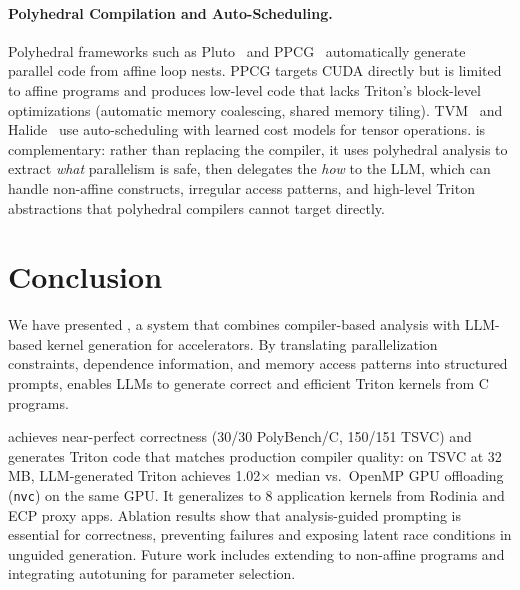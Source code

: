 \documentclass[sigconf]{acmart}
\begin{document}
\paragraph{Polyhedral Compilation and Auto-Scheduling.}
Polyhedral frameworks such as Pluto~\cite{bondhugula2008pluto} and
PPCG~\cite{verdoolaege2013ppcg} automatically generate parallel code
from affine loop nests.  PPCG targets CUDA directly but is limited to
affine programs and produces low-level code that lacks Triton's
block-level optimizations (automatic memory coalescing, shared memory
tiling).  TVM~\cite{chen2018tvm} and Halide~\cite{ragan2013halide}
use auto-scheduling with learned cost models for tensor operations.
\sysname is complementary: rather than replacing the compiler,
it uses polyhedral analysis to extract \emph{what} parallelism is
safe, then delegates the \emph{how} to the LLM, which can handle
non-affine constructs, irregular access patterns, and high-level
Triton abstractions that polyhedral compilers cannot target directly.


\section{Conclusion}
\label{sec:conclusion}
We have presented \sysname, a system that combines compiler-based analysis with LLM-based kernel generation for accelerators. By translating parallelization constraints, dependence information, and memory access patterns into structured prompts, \sysname enables LLMs to generate correct and efficient Triton kernels from C programs.

\sysname achieves near-perfect correctness (30/30 PolyBench/C, 150/151 TSVC) and generates Triton code that matches production compiler quality: on TSVC at 32\,MB, LLM-generated Triton achieves 1.02$\times$ median vs.\ OpenMP GPU offloading (\texttt{nvc}) on the same GPU. It generalizes to 8 application kernels from Rodinia and ECP proxy apps.
Ablation results show that analysis-guided prompting is essential for correctness, preventing failures and exposing latent race conditions in unguided generation. Future work includes extending to non-affine programs and integrating autotuning for parameter selection.
\end{document}
